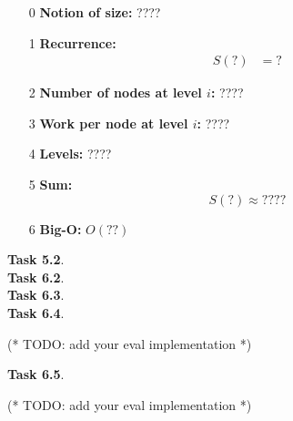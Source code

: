 \documentclass[11pt]{article}
\newcommand{\task}[1]{\clearpage\textbf{Task #1}. \\[0.5em]}
\newcommand{\Step}[1]{\colorbox{emph_color}{\color{white}\textsf{#1}}}
\begin{document}
\begin{enumerate}
    \item[\Step 0]
        \textbf{Notion of size: }%
    ???? %

    \item[\Step 1]\textbf{Recurrence:}
    \begin{align*}
        S(?) &= ? %
    \end{align*}

    \item[\Step 2] \textbf{Number of nodes at level $i$: }
    ???? %

    \item[\Step 3] \textbf{Work per node at level $i$: }
    ???? %

    \item[\Step 4] \textbf{Levels: }%
    ???? %

    \item[\Step 5]\textbf{Sum:}
    \[ S(?) \approx ???? \] %

    \item[\Step 6]\textbf{Big-O: }%
    $O(??)$ %

\end{enumerate}



\task{5.2}

\task{6.2}

\task{6.3}

\task{6.4}
\begin{codeblock}
  (* TODO: add your eval implementation *)
\end{codeblock}

\task{6.5}
\begin{codeblock}
  (* TODO: add your eval implementation *)
\end{codeblock}
\end{document}
